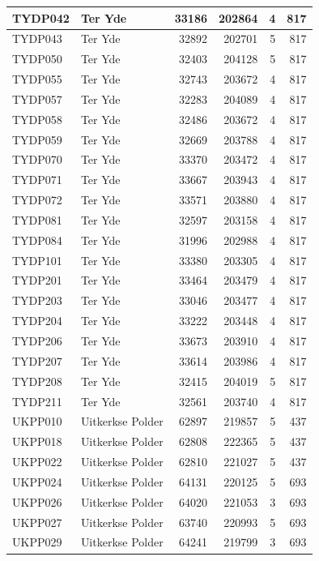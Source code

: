 \documentclass[11pt,]{book}
\begin{document}
\begin{table}
\begin{tabular}[t]{l|l|r|r|r|r}
TYDP042 & Ter Yde & 33186 & 202864 & 4 & 817\\
\hline
TYDP043 & Ter Yde & 32892 & 202701 & 5 & 817\\
\hline
TYDP050 & Ter Yde & 32403 & 204128 & 5 & 817\\
\hline
TYDP055 & Ter Yde & 32743 & 203672 & 4 & 817\\
\hline
TYDP057 & Ter Yde & 32283 & 204089 & 4 & 817\\
\hline
TYDP058 & Ter Yde & 32486 & 203672 & 4 & 817\\
\hline
TYDP059 & Ter Yde & 32669 & 203788 & 4 & 817\\
\hline
TYDP070 & Ter Yde & 33370 & 203472 & 4 & 817\\
\hline
TYDP071 & Ter Yde & 33667 & 203943 & 4 & 817\\
\hline
TYDP072 & Ter Yde & 33571 & 203880 & 4 & 817\\
\hline
TYDP081 & Ter Yde & 32597 & 203158 & 4 & 817\\
\hline
TYDP084 & Ter Yde & 31996 & 202988 & 4 & 817\\
\hline
TYDP101 & Ter Yde & 33380 & 203305 & 4 & 817\\
\hline
TYDP201 & Ter Yde & 33464 & 203479 & 4 & 817\\
\hline
TYDP203 & Ter Yde & 33046 & 203477 & 4 & 817\\
\hline
TYDP204 & Ter Yde & 33222 & 203448 & 4 & 817\\
\hline
TYDP206 & Ter Yde & 33673 & 203910 & 4 & 817\\
\hline
TYDP207 & Ter Yde & 33614 & 203986 & 4 & 817\\
\hline
TYDP208 & Ter Yde & 32415 & 204019 & 5 & 817\\
\hline
TYDP211 & Ter Yde & 32561 & 203740 & 4 & 817\\
\hline
UKPP010 & Uitkerkse Polder & 62897 & 219857 & 5 & 437\\
\hline
UKPP018 & Uitkerkse Polder & 62808 & 222365 & 5 & 437\\
\hline
UKPP022 & Uitkerkse Polder & 62810 & 221027 & 5 & 437\\
\hline
UKPP024 & Uitkerkse Polder & 64131 & 220125 & 5 & 693\\
\hline
UKPP026 & Uitkerkse Polder & 64020 & 221053 & 3 & 693\\
\hline
UKPP027 & Uitkerkse Polder & 63740 & 220993 & 5 & 693\\
\hline
UKPP029 & Uitkerkse Polder & 64241 & 219799 & 3 & 693\\
\hline

\end{tabular}
\end{table}
\end{document}
